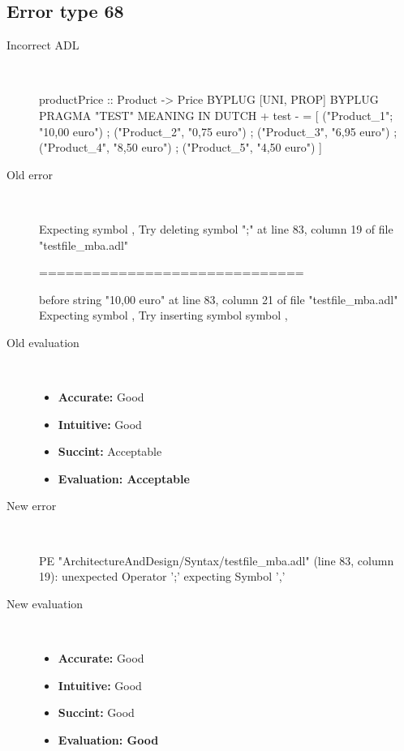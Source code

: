 \subsection{Error type 68}
  \begin{description}
  \item[Incorrect ADL]~\\
\begin{adl}
productPrice :: Product -> Price BYPLUG [UNI, PROP] BYPLUG PRAGMA "TEST"
MEANING IN DUTCH  {+ test -}
  = [ ("Product_1"; "10,00 euro")
    ; ("Product_2", "0,75 euro")
    ; ("Product_3", "6,95 euro")
    ; ("Product_4", "8,50 euro")
    ; ("Product_5", "4,50 euro")
    ]\end{adl}
  \item[Old error]~\\
\begin{haskell}
Expecting symbol ,
Try deleting symbol ";" at line 83, column 19 of file "testfile_mba.adl"

==============================

before string "10,00 euro" at line 83, column 21 of file "testfile_mba.adl"
Expecting symbol ,
Try inserting symbol symbol ,
\end{haskell}
  \item[Old evaluation]~\\
    \begin{itemize}
    \item \textbf{Accurate:} Good
    \item \textbf{Intuitive:} Good
    \item \textbf{Succint:} Acceptable
    \item \textbf{Evaluation: Acceptable}
    \end{itemize}
  \item[New error]~\\
\begin{haskell}
PE "ArchitectureAndDesign/Syntax/testfile_mba.adl" (line 83, column 19):
unexpected Operator ';'
expecting Symbol ','\end{haskell}
  \item[New evaluation]~\\
    \begin{itemize}
    \item \textbf{Accurate:} Good
    \item \textbf{Intuitive:} Good
    \item \textbf{Succint:} Good
    \item \textbf{Evaluation: Good
}
    \end{itemize}
  \end{description}

